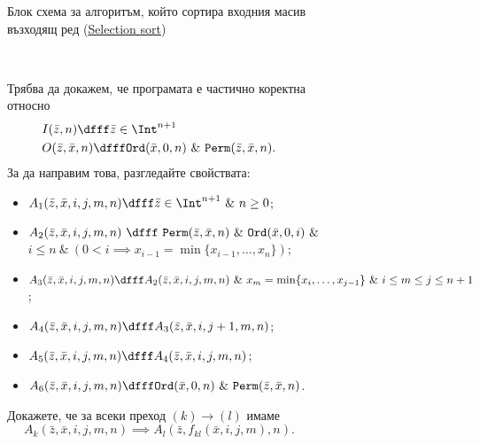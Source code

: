 \begin{figure}[H]
\begin{subfigure}[b]{0.6\textwidth}
  \caption{Блок схема за алгоритъм, който сортира входния масив възходящ ред (\href{https://en.wikipedia.org/wiki/Selection_sort}{Selection sort})}
  \end{subfigure}
  ~
  \qquad
  \begin{subfigure}[b]{0.6\textwidth}
    \footnotesize{
      Трябва да докажем, че програмата е частично коректна относно
      \begin{align*}
        & I(\bar{z},n) \dfff \bar{z} \in \Int^{n+1}\\
        & O(\bar{z},\bar{x},n) \dfff \texttt{Ord}(\bar{x},0,n)\ \&\ \texttt{Perm}(\bar{z},\bar{x},n).
      \end{align*}     
      За да направим това, разгледайте свойствата:
      \begin{itemize}
      \item 
        $A_1(\bar{z},\bar{x},i,j,m,n) \dfff \bar{z} \in \Int^{n+1}\ \&\ n \geq 0$;
      \item
        $A_2(\bar{z},\bar{x},i,j,m,n)~\dfff~\texttt{Perm}(\bar{z},\bar{x},n)\ \&\ \texttt{Ord}(\bar{x},0,i)\ \&$\\
        $i\leq n\ \&\ (0 < i \implies x_{i-1} = \min\{x_{i-1},\dots,x_n\})$;
      \item
        $A_3(\bar{z},\bar{x},i,j,m,n) \dfff A_2(\bar{z},\bar{x},i,j,m,n)\ \&\ x_m = \min\{x_i,\dots,x_{j-1}\}\ \&\ i \leq m \leq j \leq n+1$;
      \item
        $A_4(\bar{z},\bar{x},i,j,m,n) \dfff A_3(\bar{z},\bar{x},i,j+1,m,n)$;
      \item
        $A_5(\bar{z},\bar{x},i,j,m,n) \dfff A_4(\bar{z},\bar{x},i,j,m,n)$;
      \item
        $A_6(\bar{z},\bar{x},i,j,m,n) \dfff \texttt{Ord}(\bar{x},0,n)\ \&\ \texttt{Perm}(\bar{z},\bar{x},n)$.
      \end{itemize}
      Докажете, че за всеки преход $(k) \to (l)$ имаме
      \[A_k(\bar{z},\bar{x},i,j,m,n) \implies A_l(\bar{z},f_{kl}(\bar{x},i,j,m),n).\]
    }
  \end{subfigure}
\end{figure}

